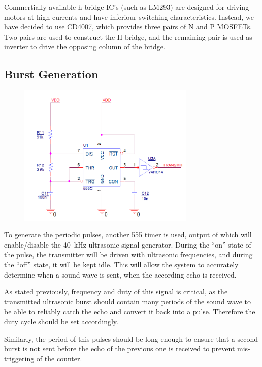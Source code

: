 \documentclass[12pt, a4paper]{article}
\begin{document}
            Commertially available h-bridge IC's (such as LM293) are designed for driving motors at high currents and have inferiour switching characteristics. Instead, we have decided to use CD4007, which provides three pairs of N and P MOSFETs. Two pairs are used to construct the H-bridge, and the remaining pair is used as inverter to drive the opposing column of the bridge.
        


        \subsection{Burst Generation}

            \begin{figure}[H]\centering
                \includegraphics[width = 0.75\textwidth]{schematics/pulse_gen.png}
                \caption[]{}
            \end{figure}

            To generate the periodic pulses, another 555 timer is used, output of which will enable/disable the \SI[]{40}{\kilo\hertz} ultrasonic signal generator. During the ``on'' state of the pulse, the transmitter will be driven with ultrasonic frequencies, and during the ``off'' state, it will be kept idle. This will allow the system to accurately determine when a sound wave is sent, when the according echo is received.

            As stated previously, frequency and duty of this signal is critical, as the transmitted ultrasonic burst should contain many periods of the sound wave to be able to reliably catch the echo and convert it back into a pulse. Therefore the duty cycle should be set accordingly. 

            Similarly, the period of this pulses should be long enough to ensure that a second burst is not sent before the echo of the previous one is received to prevent mis-triggering of the counter.
            
\end{document}
